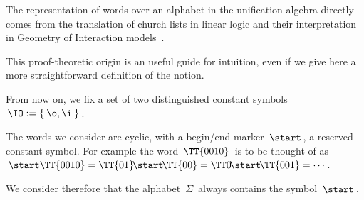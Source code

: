 The representation of words over an alphabet in the unification algebra directly comes from the translation of church lists in linear logic and their interpretation in Geometry of Interaction models~\cite{girard_geometry_1989,girard_geometry_1995}.

This proof-theoretic origin is an useful guide for intuition, even if we give here a more straightforward definition of the notion.

\medskip
From now on, we fix a set of two distinguished constant symbols $\,\IO:=\{\:\o,\i\:\}\,$.


The words we consider are cyclic, with a begin/end marker $\,\start\,$, a reserved constant symbol.
For example the word $\,\TT{0010}\,$ is to be thought of as $\,\start\TT{0010}=\TT{01}\!\start\!\TT{00}=\TT0\!\start\!\TT{001}=\cdots\,$.

We consider therefore that the alphabet $\,\Sigma\,$ always contains the symbol $\,\start\,$.

